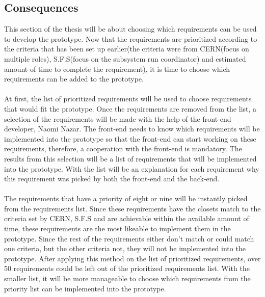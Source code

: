 \documentclass[paper=a4, fontsize=11pt,twoside]{scrartcl}	%
\begin{document}
\subsection{Consequences}
This section of the thesis will be about choosing which requirements can be used to develop the prototype. Now that the requirements are prioritized according to the criteria that has been set up earlier(the criteria were from CERN(focus on multiple roles), S.F.S(focus on the subsystem run coordinator) and estimated amount of time to complete the requirement), it is time to choose which requirements can be added to the prototype. \\ \\ 
At first, the list of prioritized requirements will be used to choose requirements that would fit the prototype. Once the requirements are removed from the list, a selection of the requirements will be made with the help of the front-end developer, Naomi Nazar. The front-end needs to know which requirements will be implemented into the prototype so that the front-end can start working on these requirements, therefore, a cooperation with the front-end is mandatory. The results from this selection will be a list of requirements that will be implemented into the prototype. With the list will be an explanation for each requirement why this requirement was picked by both the front-end and the back-end. \\ \\
The requirements that have a priority of eight or nine will be instantly picked from the requirements list. Since these requirements have the closets match to the criteria set by CERN, S.F.S and are achievable within the available amount of time, these requirements are the most likeable to implement them in the prototype. Since the rest of the requirements either don't match or could match one criteria, but the other criteria not, they will not be implemented into the prototype. After applying this method on the list of prioritized requirements, over 50 requirements could be left out of the prioritized requirements list. With the smaller list, it will be more manageable to choose which requirements from the priority list can be implemented into the prototype. \\
\end{document}
